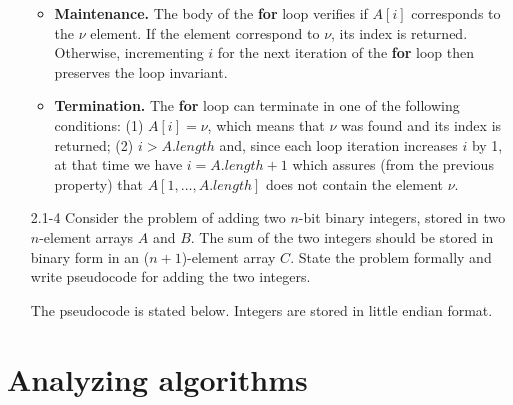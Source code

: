 \begin{enumerate}
\begin{framed}
\begin{itemize}
  \item \textbf{Maintenance.} The body of the \textbf{for} loop verifies if
    $A[i]$ corresponds to the $\nu$ element. If the element correspond to $\nu$,
    its index is returned. Otherwise, incrementing $i$ for the next iteration of
    the \textbf{for} loop then preserves the loop invariant.

  \item \textbf{Termination.} The \textbf{for} loop can terminate in one of the
    following conditions: (1) $A[i] = \nu$, which means that $\nu$ was found and
    its index is returned; (2) $i > A.length$ and, since each loop iteration
    increases $i$ by 1, at that time we have $i = A.length + 1$ which assures
    (from the previous property) that $A[1, \dots, A.length]$ does not contain
    the element $\nu$.
\end{itemize}
\end{framed}

\newpage

\item[2.1{-}4]{Consider the problem of adding two $n$-bit binary integers,
stored in two $n$-element arrays $A$ and $B$. The sum of the two integers should
be stored in binary form in an ($n + 1$)-element array $C$. State the problem
formally and write pseudocode for adding the two integers.}

\begin{framed}
The pseudocode is stated below. Integers are stored in little endian format.\\
\begin{algorithm}[H]
\SetAlgoNoEnd\DontPrintSemicolon
\BlankLine
{}
\end{algorithm}
\end{framed}

\end{enumerate}

\pagebreak

\section{Analyzing algorithms}

